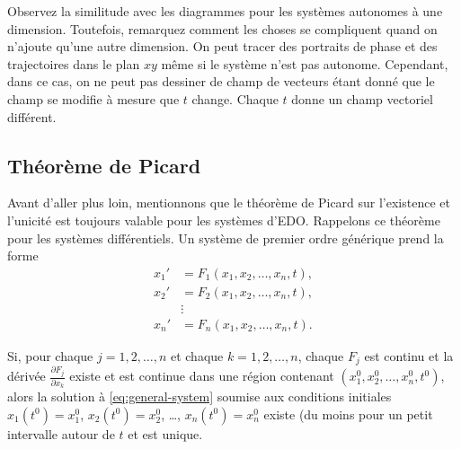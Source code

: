 \begin{myfig}
\parbox[t]{3.0in}{
 \capstart
 \caption{Portrait de phase pour $x' = 2y-x$, $y' = x$.%
 \label{sintro-vectorfield:fig}}
}
\quad
\parbox[t]{3.0in}{
 \capstart
 \caption{Portrait de phase pour $x' = 2y-x$, $y' = x$ avec la trajectoire de la solution commençant au point $(1,0)$
 pour $0 \leq t \leq 2$.%
 \label{sintro-vectorfield-sol:fig}}
}
\end{myfig}


Observez la similitude avec les diagrammes pour les systèmes autonomes à une dimension. Toutefois, remarquez comment les choses se compliquent quand on n’ajoute qu’une autre dimension.
On peut tracer des portraits de phase et des trajectoires dans le plan $xy$
même si le système n’est pas autonome. Cependant, dans ce cas, on ne peut pas dessiner de champ de vecteurs étant donné que le champ se modifie à mesure que $t$ change. Chaque $t$ donne un champ vectoriel différent.

\subsection{Théorème de Picard}

Avant d’aller plus loin, mentionnons que le théorème de Picard sur l’existence et l’unicité est toujours valable pour les systèmes d’EDO\@. Rappelons ce théorème pour les systèmes différentiels. Un système de premier ordre générique prend la forme
\begin{equation} \label{eq:general-system}
\begin{aligned}
x_1' & = F_1(x_1,x_2,\ldots,x_n,t) , \\
x_2' & = F_2(x_1,x_2,\ldots,x_n,t) , \\
& \vdots \\
x_n' & = F_n(x_1,x_2,\ldots,x_n,t) .
\end{aligned}
\end{equation}

\begin{theorem}%
\label{sys:picardthm}%
Si, pour chaque $j=1,2,\ldots,n$ et chaque
$k = 1,2,\ldots,n$,
chaque $F_j$ est continu et la dérivée
$\frac{\partial F_j}{\partial x_k}$ existe et est continue dans une région contenant $(x_1^0,x_2^0,\ldots,x_n^0,t^0)$, alors la solution à 
\eqref{eq:general-system}
soumise aux conditions initiales
$x_1(t^0) = x_1^0$,
$x_2(t^0) = x_2^0$, \ldots,
$x_n(t^0) = x_n^0$
existe (du moins pour un petit intervalle autour de $t$ et est unique.
\end{theorem}

